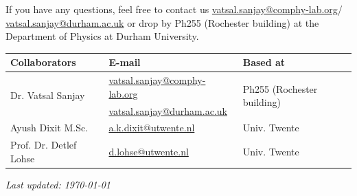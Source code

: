 \documentclass[11pt]{article}
\begin{document}
If you have any questions, feel free to contact us \href{mailto:vatsal.sanjay@comphy-lab.org}{vatsal.sanjay@comphy-lab.org}/\\\href{mailto:vatsal.sanjay@durham.ac.uk}{vatsal.sanjay@durham.ac.uk} or drop by Ph255 (Rochester building) at the Department of Physics at Durham University.

\begin{center}
\begin{tabular}{|l|l|l|}
\hline \textbf{Collaborators} & \textbf{E-mail} & \textbf{Based at} \\
\hline \multirow{2}{*}{Dr. Vatsal Sanjay} & \href{mailto:vatsal.sanjay@comphy-lab.org}{vatsal.sanjay@comphy-lab.org} & \multirow{2}{*}{Ph255 (Rochester building)} \\
& \href{mailto:vatsal.sanjay@durham.ac.uk}{vatsal.sanjay@durham.ac.uk} & \\
\hline Ayush Dixit M.Sc. & \href{mailto:a.k.dixit@utwente.nl}{a.k.dixit@utwente.nl} & Univ. Twente \\
\hline Prof. Dr. Detlef Lohse & \href{mailto:d.lohse@utwente.nl}{d.lohse@utwente.nl} & Univ. Twente  \\
\hline
\end{tabular}
\end{center}

\vspace{1em}
\noindent\textit{Last updated: \today}

\printbibliography
\end{document}
